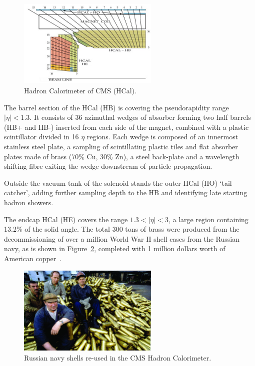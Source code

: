 \begin{figure}[htb]
  \begin{center}
    \includegraphics[width=0.6\textwidth]{Chapters/xLHCMS/HCAL.png}
    \caption{Hadron Calorimeter of CMS (HCal).}
    \label{fig:HCal}
  \end{center}
\end{figure}

The barrel section of the HCal (HB) is covering the pseudorapidity
range $\vert\eta\vert < 1.3$. It consists of 36 azimuthal wedges of
absorber forming two half barrels (HB+ and HB-) inserted from each side of the
magnet, combined with a plastic scintillator divided in 16 $\eta$
regions. Each wedge is composed of an innermost stainless steel plate,
a sampling of scintillating plastic tiles and flat absorber plates
made of brass (70\% Cu, 30\% Zn), a steel back-plate and a wavelength
shifting fibre exiting the wedge downstream of particle propagation.

Outside the vacuum tank of the solenoid stands the outer HCal (HO)
`tail-catcher', adding further sampling depth to the HB and
identifying late starting hadron showers.


The endcap HCal (HE) covers the range $1.3 < \vert\eta\vert < 3$, a
large region containing 13.2\% of the solid angle. The total 300 tons
of brass were produced from the decommissioning of over a million
World War II shell cases from the Russian navy, as is shown in
Figure~\ref{fig:urss}, completed with 1 million dollars worth of
American copper~\cite{URSS}.


\begin{figure}[htb]
  \begin{center}
    \includegraphics[width=0.6\textwidth]{Chapters/xLHCMS/urss.jpg}
    \caption{Russian navy shells re-used in the CMS Hadron Calorimeter.}
    \label{fig:urss}
  \end{center}
\end{figure}


